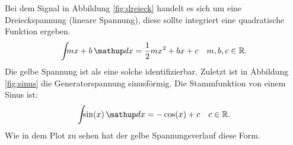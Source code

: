 Bei dem Signal in Abbildung \ref{fig:dreieck} handelt es sich um eine Dreieckspannung
(lineare Spannung),
diese sollte integriert eine quadratische Funktion ergeben.
\begin{equation*}
   \int\!\!\! mx+b \dv{x}= \frac{1}{2}mx^2+bx+c \quad m,b,c\in\mathbb{R}.
\end{equation*}
Die gelbe Spannung ist als eine solche identifizierbar.
Zuletzt ist in Abbildung \ref{fig:sinus} die Generatorspannung sinusförmig.
Die Stammfunktion von einem Sinus ist:
\begin{equation*}
  \int\!\!\! \sin(x)\dv{x}=-\cos(x)+c \quad c\in \mathbb{R}.
\end{equation*}
Wie in dem Plot zu sehen hat der gelbe Spannungsverlauf diese Form. %
